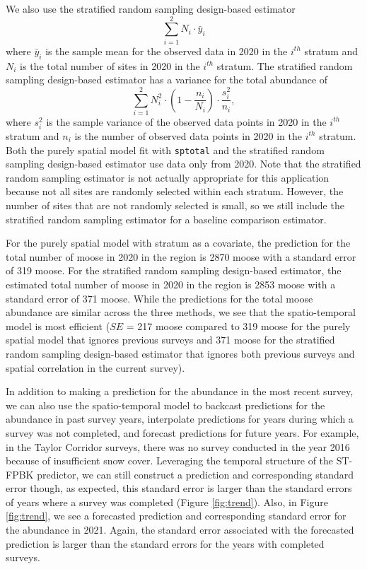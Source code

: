 \documentclass[smallextended]{svjour3}       %
\begin{document}
We also use the stratified random sampling design-based estimator
\mbox{} \begin{equation*}
\sum_{i = 1}^{2} N_i \cdot \bar{y}_i
\end{equation*} \noindent where \(\bar{y}_i\) is the sample mean for the
observed data in 2020 in the \(i^{th}\) stratum and \(N_i\) is the total
number of sites in 2020 in the \(i^{th}\) stratum. The stratified random
sampling design-based estimator has a variance for the total abundance
of \mbox{} \begin{equation*}
\sum_{i = 1}^{2} N_i^2 \cdot \left(1 - \frac{n_i}{N_i}\right) \cdot \frac{s^2_i}{n_i},
\end{equation*} \noindent where \(s^2_i\) is the sample variance of the
observed data points in 2020 in the \(i^{th}\) stratum and \(n_i\) is
the number of observed data points in 2020 in the \(i^{th}\) stratum.
Both the purely spatial model fit with \texttt{sptotal} and the
stratified random sampling design-based estimator use data only from
2020. Note that the stratified random sampling estimator is not actually
appropriate for this application because not all sites are randomly
selected within each stratum. However, the number of sites that are not
randomly selected is small, so we still include the stratified random
sampling estimator for a baseline comparison estimator.

For the purely spatial model with stratum as a covariate, the prediction
for the total number of moose in 2020 in the region is 2870 moose with a
standard error of 319 moose. For the stratified random sampling
design-based estimator, the estimated total number of moose in 2020 in
the region is 2853 moose with a standard error of 371 moose. While the
predictions for the total moose abundance are similar across the three
methods, we see that the spatio-temporal model is most efficient (\(SE\)
= 217 moose compared to 319 moose for the purely spatial model that
ignores previous surveys and 371 moose for the stratified random
sampling design-based estimator that ignores both previous surveys and
spatial correlation in the current survey).

In addition to making a prediction for the abundance in the most recent
survey, we can also use the spatio-temporal model to backcast
predictions for the abundance in past survey years, interpolate
predictions for years during which a survey was not completed, and
forecast predictions for future years. For example, in the Taylor
Corridor surveys, there was no survey conducted in the year 2016 because
of insufficient snow cover. Leveraging the temporal structure of the
ST-FPBK predictor, we can still construct a prediction and corresponding
standard error though, as expected, this standard error is larger than
the standard errors of years where a survey was completed (Figure
\ref{fig:trend}). Also, in Figure \ref{fig:trend}, we see a forecasted
prediction and corresponding standard error for the abundance in 2021.
Again, the standard error associated with the forecasted prediction is
larger than the standard errors for the years with completed surveys.
\end{document}
